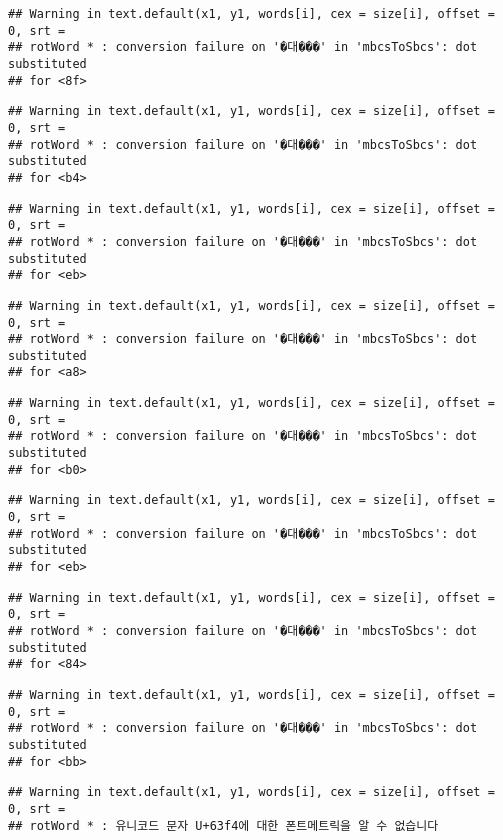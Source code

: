 \documentclass[]{article}
\begin{document}
\begin{verbatim}
## Warning in text.default(x1, y1, words[i], cex = size[i], offset = 0, srt =
## rotWord * : conversion failure on '�대���' in 'mbcsToSbcs': dot substituted
## for <8f>
\end{verbatim}

\begin{verbatim}
## Warning in text.default(x1, y1, words[i], cex = size[i], offset = 0, srt =
## rotWord * : conversion failure on '�대���' in 'mbcsToSbcs': dot substituted
## for <b4>
\end{verbatim}

\begin{verbatim}
## Warning in text.default(x1, y1, words[i], cex = size[i], offset = 0, srt =
## rotWord * : conversion failure on '�대���' in 'mbcsToSbcs': dot substituted
## for <eb>
\end{verbatim}

\begin{verbatim}
## Warning in text.default(x1, y1, words[i], cex = size[i], offset = 0, srt =
## rotWord * : conversion failure on '�대���' in 'mbcsToSbcs': dot substituted
## for <a8>
\end{verbatim}

\begin{verbatim}
## Warning in text.default(x1, y1, words[i], cex = size[i], offset = 0, srt =
## rotWord * : conversion failure on '�대���' in 'mbcsToSbcs': dot substituted
## for <b0>
\end{verbatim}

\begin{verbatim}
## Warning in text.default(x1, y1, words[i], cex = size[i], offset = 0, srt =
## rotWord * : conversion failure on '�대���' in 'mbcsToSbcs': dot substituted
## for <eb>
\end{verbatim}

\begin{verbatim}
## Warning in text.default(x1, y1, words[i], cex = size[i], offset = 0, srt =
## rotWord * : conversion failure on '�대���' in 'mbcsToSbcs': dot substituted
## for <84>
\end{verbatim}

\begin{verbatim}
## Warning in text.default(x1, y1, words[i], cex = size[i], offset = 0, srt =
## rotWord * : conversion failure on '�대���' in 'mbcsToSbcs': dot substituted
## for <bb>
\end{verbatim}

\begin{verbatim}
## Warning in text.default(x1, y1, words[i], cex = size[i], offset = 0, srt =
## rotWord * : 유니코드 문자 U+63f4에 대한 폰트메트릭을 알 수 없습니다
\end{verbatim}
\end{document}
